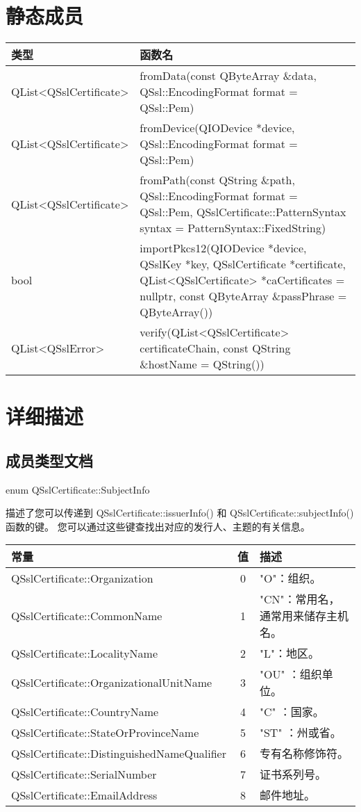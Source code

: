 
\section{静态成员}

\begin{tabular}{|l|m{29em}|}
\hline 
类型 	&函数名 \\ 
\hline
QList<QSslCertificate> &	fromData(const QByteArray \&data, QSsl::EncodingFormat format = QSsl::Pem) \\ 
\hline
QList<QSslCertificate> &	fromDevice(QIODevice *device, QSsl::EncodingFormat format = QSsl::Pem) \\ 
\hline
QList<QSslCertificate> &	fromPath(const QString \&path, QSsl::EncodingFormat format = QSsl::Pem, QSslCertificate::PatternSyntax syntax = PatternSyntax::FixedString) \\ 
\hline
bool &	importPkcs12(QIODevice *device, QSslKey *key, QSslCertificate *certificate, QList<QSslCertificate> *caCertificates = nullptr, const QByteArray \&passPhrase = QByteArray())\\
\hline
QList<QSslError> &	verify(QList<QSslCertificate> certificateChain, const QString \&hostName = QString()) \\ 
\hline
\end{tabular}


\section{详细描述}

\subsection{成员类型文档}

enum QSslCertificate::SubjectInfo

描述了您可以传递到 QSslCertificate::issuerInfo() 和 QSslCertificate::subjectInfo() 函数的键。
您可以通过这些键查找出对应的发行人、主题的有关信息。


\begin{tabular}{|l|c|l|}
\hline 
常量 &	值 &	描述 \\ 
\hline
QSslCertificate::Organization &	0 &	"O"：组织。 \\ 
\hline
QSslCertificate::CommonName &	1 &	"CN"：常用名，通常用来储存主机名。 \\ 
\hline
QSslCertificate::LocalityName 	&2 &	"L"：地区。 \\ 
\hline
QSslCertificate::OrganizationalUnitName &	3 &	"OU" ：组织单位。 \\ 
\hline
QSslCertificate::CountryName &	4& 	"C" ：国家。 \\ 
\hline
QSslCertificate::StateOrProvinceName 	&5 	&"ST" ：州或省。 \\ 
\hline
QSslCertificate::DistinguishedNameQualifier &	6 &	专有名称修饰符。\\
\hline
QSslCertificate::SerialNumber &	7 &	证书系列号。 \\ 
\hline
QSslCertificate::EmailAddress &	8 &	邮件地址。\\ 
\hline
\end{tabular}


